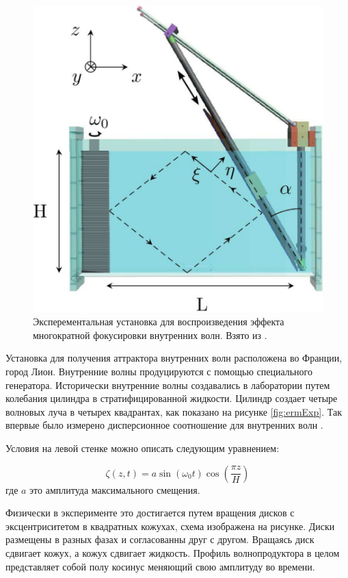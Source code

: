 \begin{figure}
    \centering
    \includegraphics[scale=0.6]{pics/SetupAttr.png}
    \caption{Эксперементальная установка для воспроизведения эффекта многократной фокусировки внутренних волн. Взято из \cite{Brouzet2016}.}
    \label{fig:attrSetup}
\end{figure}

Установка для получения аттрактора внутренних волн расположена во Франции, город Лион. Внутренние волны продуцируются с помощью специального генератора. Исторически внутренние волны создавались в лаборатории путем колебания цилиндра в стратифицированной жидкости. Цилиндр создает четыре волновых луча в четырех квадрантах, как показано на рисунке \ref{fig:ermExp}. Так впервые было измерено дисперсионное соотношение для внутренних волн \cite{Grtler1943, Mowbray1967}.

Условия на левой стенке можно описать следующим уравнением:

\begin{equation}
    \zeta (z,t) = a \sin (\omega_0 t) \cos \left( \frac{\pi z}{H} \right) 
    \label{eq:wmOsc}
\end{equation}
где $a$ это амплитуда максимального смещения. 

Физически в эксперименте это достигается путем вращения дисков с эксцентриситетом в квадратных кожухах, схема изображена на рисунке. Диски размещены в разных фазах и согласованны друг с другом. Вращаясь диск сдвигает кожух, а кожух сдвигает жидкость. Профиль волнопродуктора в целом представляет собой полу косинус меняющий свою амплитуду во времени.

